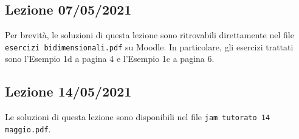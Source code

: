 \documentclass[12pt]{article}
\begin{document}
\subsection{Lezione 07/05/2021}

Per brevità, le soluzioni di questa lezione sono ritrovabili direttamente nel file \texttt{esercizi bidimensionali.pdf} su Moodle. In particolare, gli esercizi trattati sono l'Esempio 1d a pagina 4 e l'Esempio 1c a pagina 6.

\subsection{Lezione 14/05/2021}

Le soluzioni di questa lezione sono disponibili nel file \texttt{jam tutorato 14 maggio.pdf}.
\end{document}
